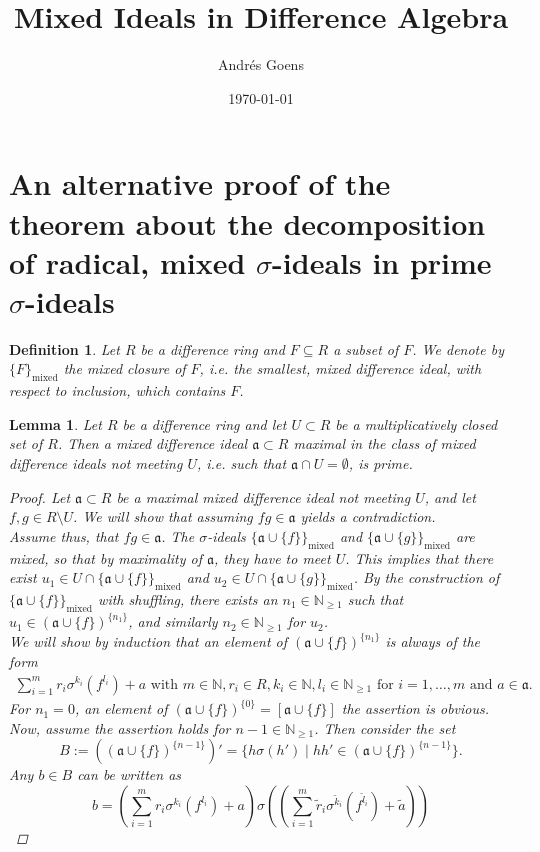 \documentclass{article}
\title{Mixed Ideals in Difference Algebra}
\author{Andr\'{e}s Goens}
\date{\today}
\def\NE{\mathbb{N}_{\geq1}}
\def\N{\mathbb{N}}
\def\a{\mathfrak{a}}
\def\s{\sigma}
\newenvironment{bew}{\begin{proof}[Proof]}{\end{proof}}
\theoremstyle{plain}
\newtheorem{lem}[Satz]{Lemma}
\newtheorem{defn}[Satz]{Definition}
\theoremstyle{definition}
\begin{document}
\setlength{\parindent}{1.5em}
\section{An alternative proof of the theorem about the decomposition of radical, mixed $\s$-ideals in prime $\s$-ideals}
\begin{defn}
Let $R$ be a difference ring and $F \subseteq R$ a subset of $F$. We denote by $\{F\}_\text{mixed}$ the mixed closure of $F$, i.e. the smallest, mixed difference ideal, with respect to inclusion, which contains $F$.
\end{defn}

\begin{lem}\label{maxmixed=prime}
Let $R$ be a difference ring and let $U \subset R$ be a multiplicatively closed set of $R$. Then a mixed difference ideal $\a \subset R$ maximal in the class of mixed difference
ideals not meeting $U$, i.e. such that $\a \cap U = \emptyset$, is prime. 
\begin{bew}
Let $\a \subset R$ be a maximal mixed difference ideal not meeting $U$, and let $f, g \in R \setminus U$. We will show that assuming $fg \in \a$ yields a contradiction. \\
\indent Assume thus, that $fg \in \a$. The $\s$-ideals $\{\a \cup \{f\}\}_\text{mixed}$ and $\{\a \cup \{g\}\}_\text{mixed}$ are mixed, so that by maximality of $\a$,
they have to meet $U$. This implies that there exist $u_1 \in U \cap \{\a \cup \{f\}\}_\text{mixed}$ and $u_2 \in U \cap \{\a \cup \{g\}\}_\text{mixed}$.
By the construction of $\{\a \cup \{f\}\}_\text{mixed}$ with shuffling, there exists an $n_1 \in \NE$ such that $u_1 \in (\a \cup \{f\})^{\{n_1\}}$, and similarly $n_2 \in \NE$ for $u_2$.
\\ We will show by induction that an element of $(\a \cup \{f\})^{\{n_1\}}$ is always of the form \begin{align}\label{generalformaf} \sum_{i=1}^m r_i \s^{k_i}(f^{l_i}) + a\text{ with }m \in \N, r_i \in R, k_i \in \N, l_i \in \NE\text{ for }i = 1,\ldots,m\text{ and }a \in \a. \end{align}
For $n_1 = 0$, an element of $(\a \cup \{f\})^{\{0\}} = [\a \cup \{f\}]$ the assertion is obvious. Now, assume the assertion holds for $n-1 \in \NE$. Then consider the set 
$$B := ((\a \cup \{f\})^{\{n-1\}})' = \{ h \s(h') \mid hh' \in (\a \cup \{f\})^{\{n-1\}} \}.$$ Any $b \in B$ can be written as 
$$ b = (\sum_{i=1}^m r_i \s^{k_i}(f^{l_i}) + a)\s((\sum_{i=1}^m \tilde r_i \s^{\tilde k_i}(f^{\tilde l_i}) + \tilde a))$$

\end{bew}
\end{lem}
\end{document}
